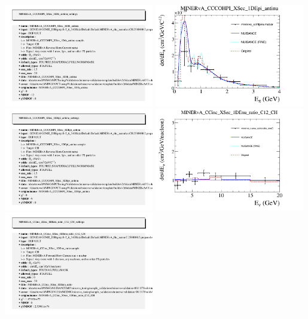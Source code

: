 \documentclass{article}
\begin{document}
\includegraphics[width=0.49\textwidth]{figures/minerva_cohthetapinumubar_info.png}
\centering
\includegraphics[width=0.49\textwidth]{figures/minerva_cohtpinumubar_comp.png}
\includegraphics[width=0.49\textwidth]{figures/minerva_cohtpinumubar_info.png}
\centering
\includegraphics[width=0.49\textwidth]{figures/minerva_numu_ccincratio_enuC_comp.png}
\includegraphics[width=0.49\textwidth]{figures/minerva_numu_ccincratio_enuC_info.png}
\end{document}
